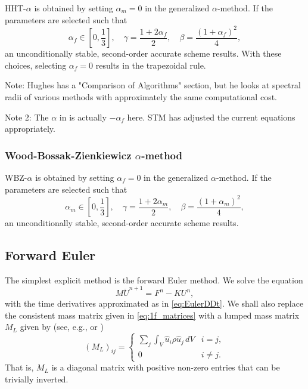 \documentclass[12pt]{article}
\begin{document}
HHT-$\alpha$ is obtained by setting $\alpha_m=0$ in the 
generalized $\alpha$-method.
If the parameters are selected such that \cite{Hughes2012}
\begin{equation}
\alpha_f \in \left[0,\frac{1}{3}\right], \quad \gamma = \frac{1+2\alpha_f}{2}, 
\quad \beta = \frac{(1+\alpha_f)^2}{4},
\end{equation}
an unconditionally stable, second-order accurate scheme results.
With these choices, selecting $\alpha_f=0$ results in the trapezoidal rule.

Note:  Hughes has a "Comparison of Algorithms" section, but he looks at
spectral radii of various methods with approximately the same computational cost.

Note 2:  The $\alpha$ in \cite{Hughes2012} is actually $-\alpha_f$ here.  STM has
adjusted the current equations appropriately.

\subsubsection{Wood-Bossak-Zienkiewicz $\alpha$-method}

WBZ-$\alpha$ is obtained by setting $\alpha_f=0$ in the 
generalized $\alpha$-method.
If the parameters are selected such that \cite{Hughes2012}
\begin{equation}
\alpha_m \in \left[0,\frac{1}{3}\right], \quad \gamma = \frac{1+2\alpha_m}{2}, 
\quad \beta = \frac{(1+\alpha_m)^2}{4},
\end{equation}
an unconditionally stable, second-order accurate scheme results.


\subsection{Forward Euler}

The simplest explicit method is the forward Euler method.
We solve the equation
\begin{equation}
M\ddot{U}^{n+1} = F^n - KU^n,
\end{equation}
with the time derivatives approximated as in \eqref{eq:EulerDDt}.
We shall also replace the consistent mass matrix given in \eqref{eq:1f_matrices}
with a lumped mass matrix $M_L$ given by (see, e.g., \cite{Hughes2012} or \cite{Cook2001})
\begin{equation}
(M_L)_{ij} =
\begin{cases}
   \sum_j \int_V \hat{u}_i \rho \hat{u}_j \, dV   & i = j, \\
   0   & i \ne j.
\end{cases}
\end{equation}
That is, $M_L$ is a diagonal matrix with positive non-zero entries
that can be trivially inverted.
\end{document}
